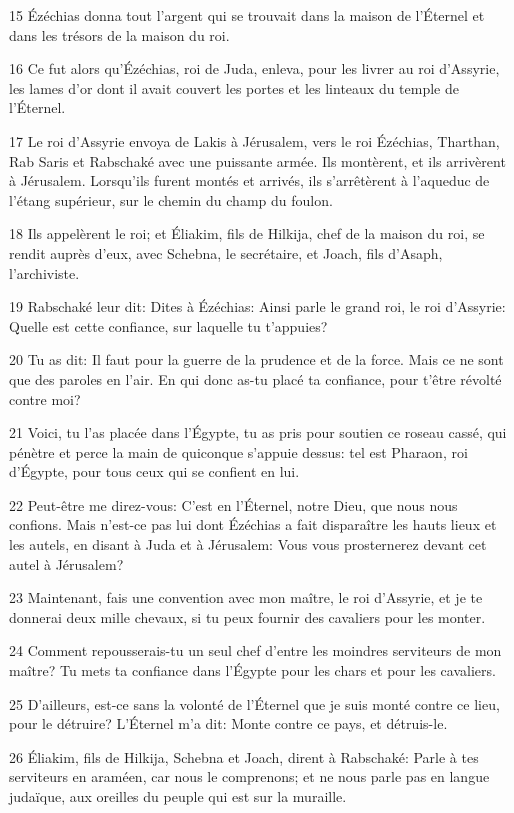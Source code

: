 \par 15 Ézéchias donna tout l'argent qui se trouvait dans la maison de l'Éternel et dans les trésors de la maison du roi.
\par 16 Ce fut alors qu'Ézéchias, roi de Juda, enleva, pour les livrer au roi d'Assyrie, les lames d'or dont il avait couvert les portes et les linteaux du temple de l'Éternel.
\par 17 Le roi d'Assyrie envoya de Lakis à Jérusalem, vers le roi Ézéchias, Tharthan, Rab Saris et Rabschaké avec une puissante armée. Ils montèrent, et ils arrivèrent à Jérusalem. Lorsqu'ils furent montés et arrivés, ils s'arrêtèrent à l'aqueduc de l'étang supérieur, sur le chemin du champ du foulon.
\par 18 Ils appelèrent le roi; et Éliakim, fils de Hilkija, chef de la maison du roi, se rendit auprès d'eux, avec Schebna, le secrétaire, et Joach, fils d'Asaph, l'archiviste.
\par 19 Rabschaké leur dit: Dites à Ézéchias: Ainsi parle le grand roi, le roi d'Assyrie: Quelle est cette confiance, sur laquelle tu t'appuies?
\par 20 Tu as dit: Il faut pour la guerre de la prudence et de la force. Mais ce ne sont que des paroles en l'air. En qui donc as-tu placé ta confiance, pour t'être révolté contre moi?
\par 21 Voici, tu l'as placée dans l'Égypte, tu as pris pour soutien ce roseau cassé, qui pénètre et perce la main de quiconque s'appuie dessus: tel est Pharaon, roi d'Égypte, pour tous ceux qui se confient en lui.
\par 22 Peut-être me direz-vous: C'est en l'Éternel, notre Dieu, que nous nous confions. Mais n'est-ce pas lui dont Ézéchias a fait disparaître les hauts lieux et les autels, en disant à Juda et à Jérusalem: Vous vous prosternerez devant cet autel à Jérusalem?
\par 23 Maintenant, fais une convention avec mon maître, le roi d'Assyrie, et je te donnerai deux mille chevaux, si tu peux fournir des cavaliers pour les monter.
\par 24 Comment repousserais-tu un seul chef d'entre les moindres serviteurs de mon maître? Tu mets ta confiance dans l'Égypte pour les chars et pour les cavaliers.
\par 25 D'ailleurs, est-ce sans la volonté de l'Éternel que je suis monté contre ce lieu, pour le détruire? L'Éternel m'a dit: Monte contre ce pays, et détruis-le.
\par 26 Éliakim, fils de Hilkija, Schebna et Joach, dirent à Rabschaké: Parle à tes serviteurs en araméen, car nous le comprenons; et ne nous parle pas en langue judaïque, aux oreilles du peuple qui est sur la muraille.
